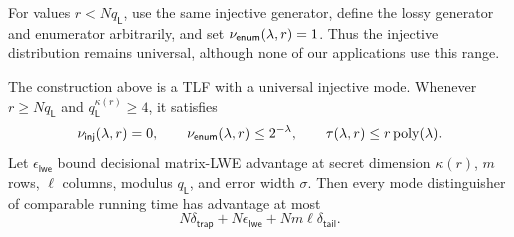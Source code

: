 For values $r<Nq_{\mathsf L}$, use the same injective generator, define the
lossy generator and enumerator arbitrarily, and set
$\nu_{\mathsf{enum}}(\lambda,r)=1$. Thus the injective distribution remains
universal, although none of our applications use this range.

\begin{proposition} \label{prop-tlf-lwe}
The construction above is a TLF with a universal injective mode. Whenever
$r\ge Nq_{\mathsf L}$ and $q_{\mathsf L}^{\kappa(r)}\ge4$, it satisfies
$$
\nu_{\mathsf{inj}}(\lambda,r)=0,\qquad
\nu_{\mathsf{enum}}(\lambda,r)\le2^{-\lambda},\qquad
\tau(\lambda,r)\le r\mathop{\rm poly}\nolimits(\lambda).
$$
Let $\epsilon_{\mathsf{lwe}}$ bound decisional matrix-LWE advantage at secret
dimension $\kappa(r)$, $m$ rows, $\ell$ columns, modulus $q_{\mathsf L}$, and
error width $\sigma$. Then every mode distinguisher of comparable running time has
advantage at most
$$
N\delta_{\mathsf{trap}}
+N\epsilon_{\mathsf{lwe}}
+Nm\ell\delta_{\mathsf{tail}}.
$$
\end{proposition}

